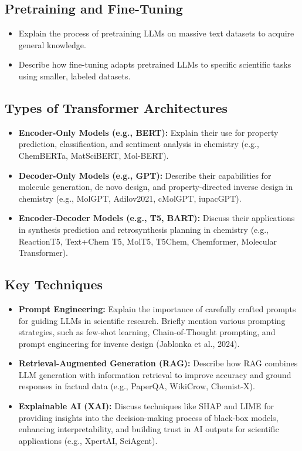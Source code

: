 \documentclass{article}
\begin{document}
\subsection{Pretraining and Fine-Tuning}
\begin{itemize}
    \item Explain the process of pretraining LLMs on massive text datasets to acquire general knowledge.
    \item Describe how fine-tuning adapts pretrained LLMs to specific scientific tasks using smaller, labeled datasets.
\end{itemize}

\subsection{Types of Transformer Architectures}
\begin{itemize}
    \item \textbf{Encoder-Only Models (e.g., BERT):} Explain their use for property prediction, classification, and sentiment analysis in chemistry (e.g., ChemBERTa, MatSciBERT, Mol-BERT).
    \item \textbf{Decoder-Only Models (e.g., GPT):} Describe their capabilities for molecule generation, de novo design, and property-directed inverse design in chemistry (e.g., MolGPT, Adilov2021, cMolGPT, iupacGPT).
    \item \textbf{Encoder-Decoder Models (e.g., T5, BART):} Discuss their applications in synthesis prediction and retrosynthesis planning in chemistry (e.g., ReactionT5, Text+Chem T5, MolT5, T5Chem, Chemformer, Molecular Transformer).
\end{itemize}

\subsection{Key Techniques}
\begin{itemize}
    \item \textbf{Prompt Engineering:} Explain the importance of carefully crafted prompts for guiding LLMs in scientific research. Briefly mention various prompting strategies, such as few-shot learning, Chain-of-Thought prompting, and prompt engineering for inverse design (Jablonka et al., 2024).
    \item \textbf{Retrieval-Augmented Generation (RAG):} Describe how RAG combines LLM generation with information retrieval to improve accuracy and ground responses in factual data (e.g., PaperQA, WikiCrow, Chemist-X).
    \item \textbf{Explainable AI (XAI):} Discuss techniques like SHAP and LIME for providing insights into the decision-making process of black-box models, enhancing interpretability, and building trust in AI outputs for scientific applications (e.g., XpertAI, SciAgent).
\end{itemize}
\end{document}
